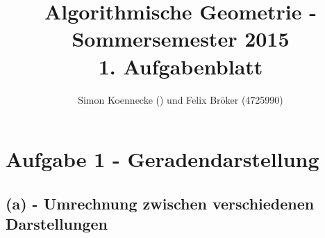 \documentclass[a4paper]{article}
\begin{document}
\title{Algorithmische Geometrie - Sommersemester 2015\\
       1. Aufgabenblatt }
\author{Simon Koennecke (\hspace{2cm}) und Felix Bröker (4725990)}
\date{}
\maketitle

\section*{Aufgabe 1 - Geradendarstellung}

\subsection*{(a) - Umrechnung zwischen verschiedenen Darstellungen} 
\end{document}
